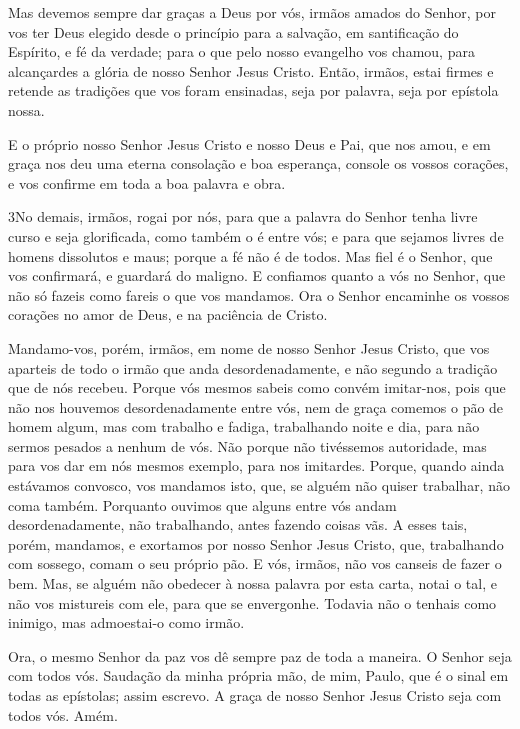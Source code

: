 Mas devemos sempre dar graças a Deus por vós, irmãos amados do
Senhor, por vos ter Deus elegido desde o princípio para a salvação,
em santificação do Espírito, e fé da verdade; para o que pelo
nosso evangelho vos chamou, para alcançardes a glória de nosso
Senhor Jesus Cristo. Então, irmãos, estai firmes e retende as
tradições que vos foram ensinadas, seja por palavra, seja por
epístola nossa.

E o próprio nosso Senhor Jesus Cristo e nosso Deus e Pai, que nos
amou, e em graça nos deu uma eterna consolação e boa esperança,
console os vossos corações, e vos confirme em toda a boa
palavra e obra.

\medskip

\lettrine{3} No demais, irmãos, rogai por nós, para que a
palavra do Senhor tenha livre curso e seja glorificada, como também
o é entre vós; e para que sejamos livres de homens dissolutos e
maus; porque a fé não é de todos. Mas fiel é o Senhor, que vos
confirmará, e guardará do maligno. E confiamos quanto a vós no
Senhor, que não só fazeis como fareis o que vos mandamos. Ora o
Senhor encaminhe os vossos corações no amor de Deus, e na paciência
de Cristo.

Mandamo-vos, porém, irmãos, em nome de nosso Senhor Jesus Cristo,
que vos aparteis de todo o irmão que anda desordenadamente, e não
segundo a tradição que de nós recebeu. Porque vós mesmos sabeis
como convém imitar-nos, pois que não nos houvemos desordenadamente
entre vós, nem de graça comemos o pão de homem algum, mas com
trabalho e fadiga, trabalhando noite e dia, para não sermos pesados
a nenhum de vós. Não porque não tivéssemos autoridade, mas para
vos dar em nós mesmos exemplo, para nos imitardes. Porque,
quando ainda estávamos convosco, vos mandamos isto, que, se alguém
não quiser trabalhar, não coma também. Porquanto ouvimos que
alguns entre vós andam desordenadamente, não trabalhando, antes
fazendo coisas vãs. A esses tais, porém, mandamos, e
exortamos por nosso Senhor Jesus Cristo, que, trabalhando com
sossego, comam o seu próprio pão. E vós, irmãos, não vos
canseis de fazer o bem. Mas, se alguém não obedecer à nossa
palavra por esta carta, notai o tal, e não vos mistureis com ele,
para que se envergonhe. Todavia não o tenhais como inimigo,
mas admoestai-o como irmão.

Ora, o mesmo Senhor da paz vos dê sempre paz de toda a maneira. O
Senhor seja com todos vós. Saudação da minha própria mão, de
mim, Paulo, que é o sinal em todas as epístolas; assim escrevo.
A graça de nosso Senhor Jesus Cristo seja com todos vós.
Amém.

